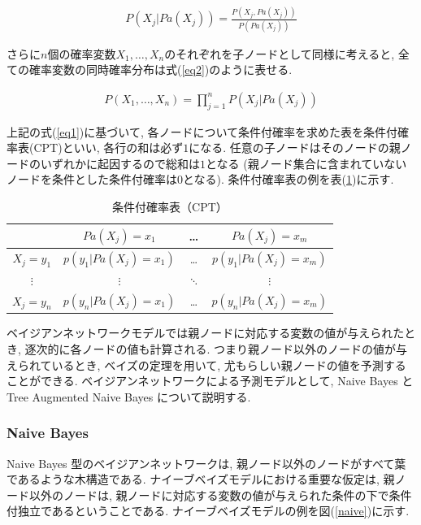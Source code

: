 \documentclass[a4j,12pt]{jarticle}
\begin{document}
\begin{eqnarray}
\label{eq1}
P(X_j | Pa(X_j)) = \frac{P(X_j, Pa(X_j))}{P(Pa(X_j))} 
\end{eqnarray}

さらに$n$個の確率変数$X_1, \dots, X_n$のそれぞれを子ノードとして同様に考えると, 全ての確率変数の同時確率分布は式(\ref{eq2})のように表せる.

\begin{eqnarray}
\label{eq2}
P(X_1, \dots, X_n) = \prod_{j=1}^n P(X_j | Pa(X_j))
\end{eqnarray}

上記の式(\ref{eq1})に基づいて, 各ノードについて条件付確率を求めた表を条件付確率表(CPT)といい, 各行の和は必ず$1$になる. 任意の子ノードはそのノードの親ノードのいずれかに起因するので総和は$1$となる (親ノード集合に含まれていないノードを条件とした条件付確率は$0$となる). 条件付確率表の例を表(\ref{cpt})に示す. 

\begin{table}[H]
\begin{center}
\caption{条件付確率表（CPT）}   %
\label{cpt}   %
\begin{tabular}{|c||c|c|c|}   %
\hline
 & $Pa(X_{j})=x_{1}$ & \dots & $Pa(X_{j})=x_{m}$
\\ \hline
$X_j=y_1$ & $p(y_1|Pa(X_j)=x_1)$ & \dots & $p(y_1|Pa(X_j)=x_m)$
\\ \hline
$\vdots$ & $\vdots$ & $\ddots$ & $\vdots$
\\ \hline
$X_j=y_n$ & $ p(y_n|Pa(X_j)=x_1)$ & \dots & $p(y_n|Pa(X_j)=x_m)$
\\ \hline
\end{tabular}
\end{center}
\end{table}

ベイジアンネットワークモデルでは親ノードに対応する変数の値が与えられたとき, 逐次的に各ノードの値も計算される. つまり親ノード以外のノードの値が与えられているとき, ベイズの定理を用いて, 尤もらしい親ノードの値を予測することができる. ベイジアンネットワークによる予測モデルとして, Naive Bayes と Tree Augmented Naive Bayes について説明する.

\subsubsection{Naive Bayes}

Naive Bayes 型のベイジアンネットワークは, 親ノード以外のノードがすべて葉であるような木構造である. ナイーブベイズモデルにおける重要な仮定は, 親ノード以外のノードは, 親ノードに対応する変数の値が与えられた条件の下で条件付独立であるということである. ナイーブベイズモデルの例を図(\ref{naive})に示す.
\end{document}
